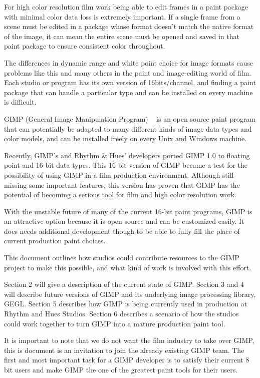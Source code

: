 
For high color resolution film work being able to edit frames in a paint
package with minimal color data loss is extremely important. If a single frame
from a scene must be edited in a package whose format doesn't match the native
format of the image, it can mean the entire scene must be opened and saved in
that paint package to ensure consistent color throughout.   

The differences in dynamic range and white point choice for image formats cause
problems like this and many others in the paint and image-editing world of film.
Each studio or program has its own version of 16bits/channel, and finding a
paint package that can handle a particular type and can be installed on every
machine is difficult.

GIMP (General Image Manipulation Program) ~\cite{gegl} is an open source paint program that
can potentially be adapted to many different kinds of image data types and
color models, and can be installed freely on every Unix and Windows machine. 

Recently, GIMP's and Rhythm \& Hues' developers ported GIMP 1.0 to floating point
and 16-bit data types. This 16-bit version of GIMP became a test for the
possibility of using GIMP in a film production environment. Although still
missing some important features, this version has proven that GIMP has the
potential of becoming a serious tool for film and high color resolution work. 

With the unstable future of many of the current 16-bit paint programs, GIMP is
an attractive option because it is open source and can be customized easily.
It does needs additional development though to be able to fully fill the place
of current production paint choices. 

This document outlines how studios could contribute resources to the GIMP
project to make this possible, and what kind of work is involved with this
effort.  

Section 2 will give a description of the current state of GIMP. Section 3
and 4 will describe future versions of GIMP and its underlying image processing
library, GEGL. Section 5 describes how GIMP is being currently used in
production at Rhythm and Hues Studios. Section 6 describes a scenario of how
the studios could work together to turn GIMP into a mature production paint
tool.

It is important to note that we do not want the film industry to take over GIMP, this is document is an invitation to join the already existing GIMP team. The first and most important task for a GIMP developer is to satisfy their current 8 bit users and make GIMP the one of the greatest paint tools for their users.


